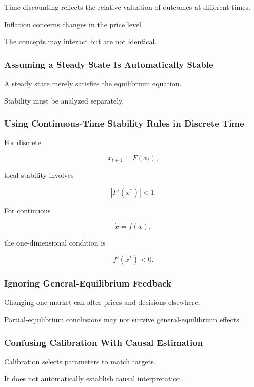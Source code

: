 Time discounting reflects the relative valuation of outcomes at different
times.

Inflation concerns changes in the price level.

The concepts may interact but are not identical.

\subsubsection{Assuming a Steady State Is Automatically Stable}

A steady state merely satisfies the equilibrium equation.

Stability must be analyzed separately.

\subsubsection{Using Continuous-Time Stability Rules in Discrete Time}

For discrete

\[
x_{t+1}=F(x_t),
\]

local stability involves

\[
|F'(x^*)|<1.
\]

For continuous

\[
\dot{x}=f(x),
\]

the one-dimensional condition is

\[
f'(x^*)<0.
\]

\subsubsection{Ignoring General-Equilibrium Feedback}

Changing one market can alter prices and decisions elsewhere.

Partial-equilibrium conclusions may not survive general-equilibrium effects.

\subsubsection{Confusing Calibration With Causal Estimation}

Calibration selects parameters to match targets.

It does not automatically establish causal interpretation.

